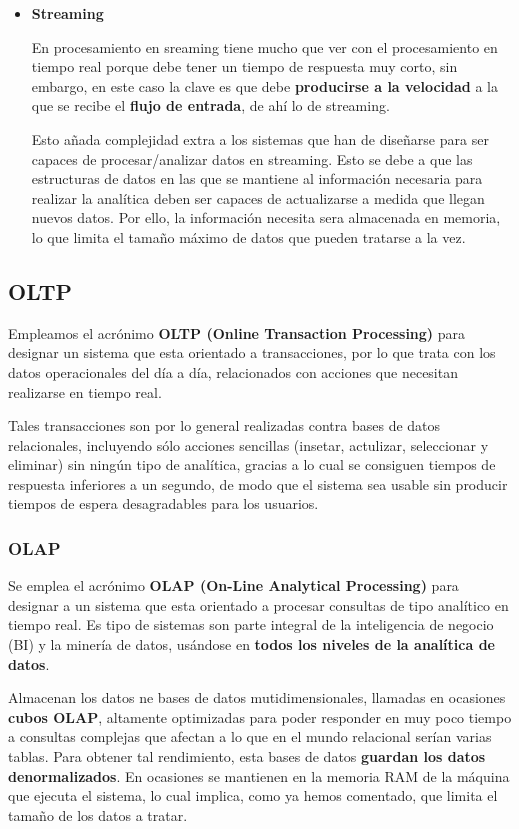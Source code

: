 \begin{itemize}
	\item \textbf{Streaming}
	
	En procesamiento en sreaming tiene mucho que ver con el procesamiento en tiempo real porque debe tener un tiempo de respuesta muy corto, sin embargo, en este caso la clave es que debe \textbf{producirse a la velocidad} a la que se recibe el \textbf{flujo de entrada}, de ahí lo de streaming. 
	
	Esto añada complejidad extra a los sistemas que han de diseñarse para ser capaces de procesar/analizar datos en streaming. Esto se debe a que las estructuras de datos en las que se mantiene al información necesaria para realizar la analítica deben ser capaces de actualizarse a medida que llegan nuevos datos. Por ello, la información necesita sera almacenada en memoria, lo que limita el tamaño máximo de datos que pueden tratarse a la vez. 
\end{itemize}

\subsection{OLTP}

Empleamos el acrónimo \textbf{OLTP (Online Transaction Processing) }para designar un sistema que esta orientado a transacciones, por lo que trata con los datos operacionales del día a día, relacionados con acciones que necesitan realizarse en tiempo real.

Tales transacciones son por lo general realizadas contra bases de datos relacionales, incluyendo sólo acciones sencillas (insetar, actulizar, seleccionar y eliminar) sin ningún tipo de analítica, gracias a lo cual se consiguen tiempos de respuesta inferiores a un segundo, de modo que el sistema sea usable sin producir tiempos de espera desagradables para los usuarios. 

\subsubsection{OLAP}

Se emplea el acrónimo \textbf{OLAP (On-Line Analytical Processing)} para designar a un sistema que esta orientado a procesar consultas de tipo analítico en tiempo real. Es tipo de sistemas son parte integral de la 
inteligencia de negocio (BI) y la minería de datos, usándose en \textbf{todos los niveles de la analítica de datos}. 

Almacenan los datos ne bases de datos mutidimensionales, llamadas en ocasiones \textbf{cubos OLAP}, altamente optimizadas para poder responder en muy poco tiempo a consultas complejas que afectan a lo que en el mundo relacional serían varias tablas. Para obtener tal rendimiento, esta bases de datos \textbf{guardan los datos denormalizados}. En ocasiones se mantienen en la memoria RAM de la máquina que ejecuta el sistema, lo cual implica, como ya hemos comentado, que limita el tamaño de los datos a tratar. 

